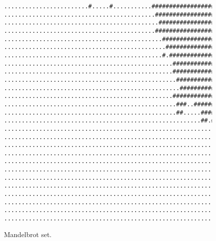 \documentclass[mscres,cdtppar,twoside,openright,logo,rightchapter,normalheadings]{infthesis}
\theoremstyle{definition}
\begin{document}
\begin{figure}
\begin{lstlisting}[style={},basicstyle=\ttfamily\tiny,breaklines=false,morekeywords={\#},keywordstyle={\color{blue}}]
........................#.....#...........###########################################...............
...........................................##########################################...............
............................................###########################################.............
...........................................############################################.............
.............................................#######################################................
..............................................######################################................
.............................................#.####################################.................
................................................##################################..................
................................................#################################...................
.................................................##################################.................
..................................................##################################................
................................................###############################.###.................
.................................................###..########################...#.#................
.................................................##.....####################........................
........................................................##.##############..#........................
............................................................#....#.#................................
..............................................................######................................
..............................................................#######...............................
..............................................................#######...............................
.............................................................########...............................
..............................................................#######...............................
..............................................................#######...............................
...............................................................#####................................
.................................................................##.................................
.................................................................##.................................
....................................................................................................
....................................................................................................
\end{lstlisting}
\caption{Mandelbrot set.}\label{fig:mandelbrot}
\end{figure}
\end{document}
